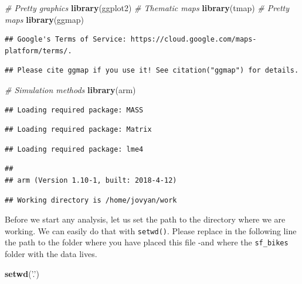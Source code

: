 \documentclass[]{book}
\newenvironment{Shaded}{\begin{snugshade}}{\end{snugshade}}
\newcommand{\CommentTok}[1]{\textcolor[rgb]{0.56,0.35,0.01}{\textit{#1}}}
\newcommand{\KeywordTok}[1]{\textcolor[rgb]{0.13,0.29,0.53}{\textbf{#1}}}
\newcommand{\NormalTok}[1]{#1}
\newcommand{\StringTok}[1]{\textcolor[rgb]{0.31,0.60,0.02}{#1}}
\begin{document}
\begin{Shaded}
\begin{Highlighting}[]
\CommentTok{# Pretty graphics}
\KeywordTok{library}\NormalTok{(ggplot2)}
\CommentTok{# Thematic maps}
\KeywordTok{library}\NormalTok{(tmap)}
\CommentTok{# Pretty maps}
\KeywordTok{library}\NormalTok{(ggmap)}
\end{Highlighting}
\end{Shaded}

\begin{verbatim}
## Google's Terms of Service: https://cloud.google.com/maps-platform/terms/.
\end{verbatim}

\begin{verbatim}
## Please cite ggmap if you use it! See citation("ggmap") for details.
\end{verbatim}

\begin{Shaded}
\begin{Highlighting}[]
\CommentTok{# Simulation methods}
\KeywordTok{library}\NormalTok{(arm)}
\end{Highlighting}
\end{Shaded}

\begin{verbatim}
## Loading required package: MASS
\end{verbatim}

\begin{verbatim}
## Loading required package: Matrix
\end{verbatim}

\begin{verbatim}
## Loading required package: lme4
\end{verbatim}

\begin{verbatim}
## 
## arm (Version 1.10-1, built: 2018-4-12)
\end{verbatim}

\begin{verbatim}
## Working directory is /home/jovyan/work
\end{verbatim}

Before we start any analysis, let us set the path to the directory where we are working. We can easily do that with \texttt{setwd()}. Please replace in the following line the path to the folder where you have placed this file -and where the \texttt{sf\_bikes} folder with the data lives.

\begin{Shaded}
\begin{Highlighting}[]
\KeywordTok{setwd}\NormalTok{(}\StringTok{'.'}\NormalTok{)}
\end{Highlighting}
\end{Shaded}
\end{document}

